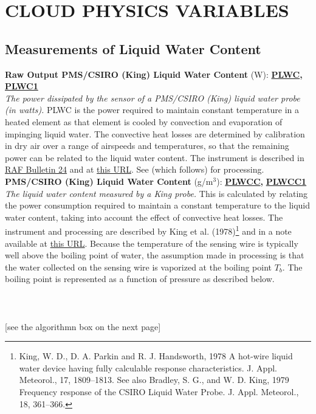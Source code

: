 
\section{CLOUD PHYSICS VARIABLES}

\subsection{Measurements of Liquid Water Content}
\begin{hangparagraphs}
\textbf{Raw Output PMS/CSIRO (King) Liquid Water Content} (W):\textbf{
}\textbf{\uline{PLWC}}\textbf{,
}\textbf{\uline{PLWC1}}\label{punch:5-3}\\
\emph{The power dissipated by the sensor of a PMS/CSIRO
(King) liquid water probe (in watts).
}PLWC is the power required to maintain constant temperature in a
heated element as that element is cooled by convection and evaporation
of impinging liquid water. The convective heat losses are determined
by calibration in dry air over a range of airspeeds and temperatures,
so that the remaining power can be related to the liquid water content.
The instrument is described in \href{https://opensky.ucar.edu/islandora/object/archives\%3A8155}{RAF Bulletin 24}
and at \href{http://www.eol.ucar.edu/instruments/king-csiro-liquid-water-sensor}{this URL}.
See  (which follows) for processing.\\

\textbf{\label{PLWCC}PMS/CSIRO (King) Liquid Water Content} (g/m$^{3}$):\textbf{
}\textbf{\uline{PLWCC}}\textbf{,
}\textbf{\uline{PLWCC1}}\\
\emph{The liquid water content}
\emph{measured by a King probe.} This is calculated by relating the
power consumption required to maintain a constant temperature to the
liquid water content, taking into account the effect of convective
heat losses. The instrument and processing are described by King et
al. (1978)\footnote{King, W. D., D. A. Parkin and R. J. Handsworth, 1978 A hot-wire liquid
water device having fully calculable response characteristics. J.
Appl. Meteorol., 17, 1809--1813. See also Bradley, S. G., and W.
D. King, 1979 Frequency response of the CSIRO Liquid Water Probe.
J. Appl. Meteorol., 18, 361--366.} and in a note available at \href{https://github.com/NCAR/aircraft_ProcessingAlgorithms/blob/master/www/PLWCCrev140214.pdf}{this URL}.
Because the temperature of the sensing wire is typically well above
the boiling point of water, the assumption
made in processing is that the water collected on the sensing wire
is vaporized at the boiling point $T_{b}$. The boiling point is represented
as a function of pressure as described below. \\
\\
\\
\\
{[}see the algorithmn box on the next page{]}\\
\vfill


\end{hangparagraphs}
